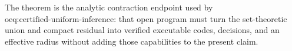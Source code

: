 The theorem is the analytic contraction endpoint used by \(\text{oeq:certified-uniform-inference}\): that open program must turn the set-theoretic union and compact residual into verified executable codes, decisions, and an effective radius without adding those capabilities to the present claim.